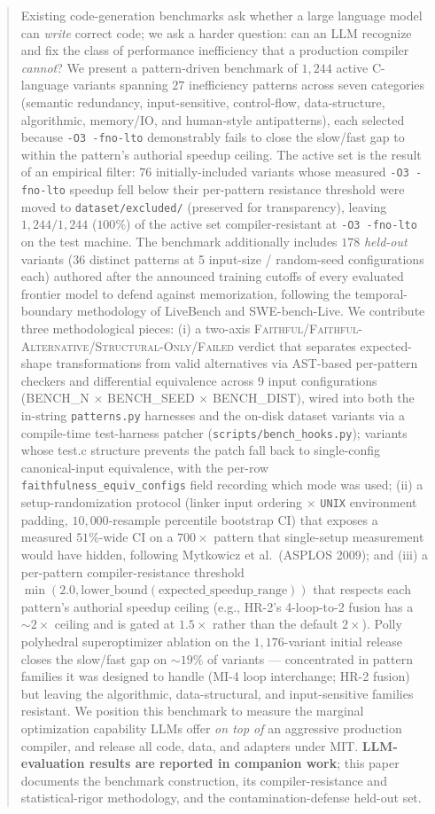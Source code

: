 \begin{abstract}
Existing code-generation benchmarks ask whether a large language model can \emph{write} correct code; we ask a harder question: can an LLM recognize and fix the class of performance inefficiency that a production compiler \emph{cannot}? We present a pattern-driven benchmark of $1{,}244$ active C-language variants spanning $27$ inefficiency patterns across seven categories (semantic redundancy, input-sensitive, control-flow, data-structure, algorithmic, memory/IO, and human-style antipatterns), each selected because \texttt{-O3 -fno-lto} demonstrably fails to close the slow/fast gap to within the pattern's authorial speedup ceiling. The active set is the result of an empirical filter: $76$ initially-included variants whose measured \texttt{-O3 -fno-lto} speedup fell below their per-pattern resistance threshold were moved to \texttt{dataset/excluded/} (preserved for transparency), leaving $1{,}244/1{,}244$ ($100\%$) of the active set compiler-resistant at \texttt{-O3 -fno-lto} on the test machine. The benchmark additionally includes $178$ \emph{held-out} variants (36 distinct patterns at 5 input-size / random-seed configurations each) authored after the announced training cutoffs of every evaluated frontier model to defend against memorization, following the temporal-boundary methodology of LiveBench and SWE-bench-Live. We contribute three methodological pieces: (i) a two-axis \textsc{Faithful/Faithful-Alternative/Structural-Only/Failed} verdict that separates expected-shape transformations from valid alternatives via AST-based per-pattern checkers and differential equivalence across $9$ input configurations (BENCH\_N $\times$ BENCH\_SEED $\times$ BENCH\_DIST), wired into both the in-string \texttt{patterns.py} harnesses and the on-disk dataset variants via a compile-time test-harness patcher (\texttt{scripts/bench\_hooks.py}); variants whose test.c structure prevents the patch fall back to single-config canonical-input equivalence, with the per-row \texttt{faithfulness\_equiv\_configs} field recording which mode was used; (ii) a setup-randomization protocol (linker input ordering $\times$ \texttt{UNIX} environment padding, $10{,}000$-resample percentile bootstrap CI) that exposes a measured $51\%$-wide CI on a $700\!\times$ pattern that single-setup measurement would have hidden, following Mytkowicz et al.\ (ASPLOS 2009); and (iii) a per-pattern compiler-resistance threshold $\min(2.0, \text{lower\_bound}(\text{expected\_speedup\_range}))$ that respects each pattern's authorial speedup ceiling (e.g., HR-2's 4-loop-to-2 fusion has a $\sim\!2\times$ ceiling and is gated at $1.5\times$ rather than the default $2\times$). Polly polyhedral superoptimizer ablation on the $1{,}176$-variant initial release closes the slow/fast gap on $\sim\!19\%$ of variants --- concentrated in pattern families it was designed to handle (MI-4 loop interchange; HR-2 fusion) but leaving the algorithmic, data-structural, and input-sensitive families resistant. We position this benchmark to measure the marginal optimization capability LLMs offer \emph{on top of} an aggressive production compiler, and release all code, data, and adapters under MIT. \textbf{LLM-evaluation results are reported in companion work}; this paper documents the benchmark construction, its compiler-resistance and statistical-rigor methodology, and the contamination-defense held-out set.
\end{abstract}
